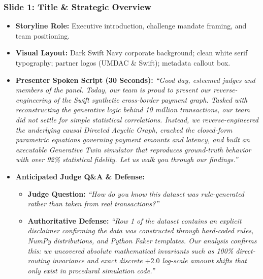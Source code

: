 \documentclass[11pt,a4paper]{article}
\begin{document}
\subsubsection{Slide 1: Title \& Strategic Overview}
\begin{itemize}
    \item \textbf{Storyline Role:} Executive introduction, challenge mandate framing, and team positioning.
    \item \textbf{Visual Layout:} Dark Swift Navy corporate background; clean white serif typography; partner logos (UMDAC \& Swift); metadata callout box.
    \item \textbf{Presenter Spoken Script (30 Seconds):}
    \textit{``Good day, esteemed judges and members of the panel. Today, our team is proud to present our reverse-engineering of the Swift synthetic cross-border payment graph. Tasked with reconstructing the generative logic behind 10 million transactions, our team did not settle for simple statistical correlations. Instead, we reverse-engineered the underlying causal Directed Acyclic Graph, cracked the closed-form parametric equations governing payment amounts and latency, and built an executable Generative Twin simulator that reproduces ground-truth behavior with over 92\% statistical fidelity. Let us walk you through our findings.''}
    \item \textbf{Anticipated Judge Q\&A \& Defense:}
    \begin{itemize}
        \item \textbf{Judge Question:} \textit{``How do you know this dataset was rule-generated rather than taken from real transactions?''}
        \item \textbf{Authoritative Defense:} \textit{``Row 1 of the dataset contains an explicit disclaimer confirming the data was constructed through hard-coded rules, NumPy distributions, and Python Faker templates. Our analysis confirms this: we uncovered absolute mathematical invariants such as 100\% direct-routing invariance and exact discrete $+2.0$ log-scale amount shifts that only exist in procedural simulation code.''}
    \end{itemize}
\end{itemize}
\end{document}
